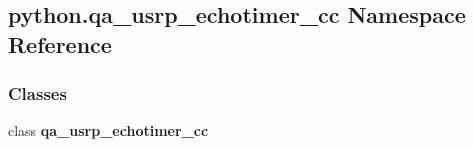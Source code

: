 \subsection{python.\+qa\+\_\+usrp\+\_\+echotimer\+\_\+cc Namespace Reference}
\label{namespacepython_1_1qa__usrp__echotimer__cc}
\subsubsection*{Classes}
\begin{DoxyCompactItemize}
\item 
class {\bf qa\+\_\+usrp\+\_\+echotimer\+\_\+cc}
\end{DoxyCompactItemize}
